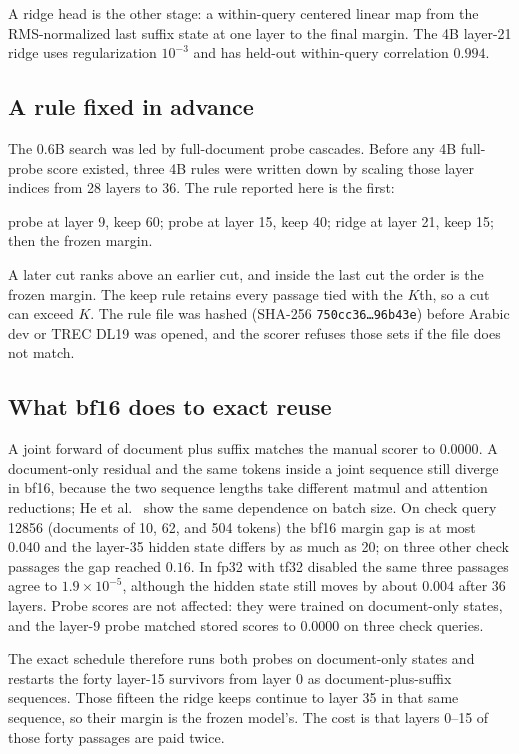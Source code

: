 \documentclass[11pt, a4paper]{article}
\begin{document}
A ridge head is the other stage: a within-query centered linear map from the RMS-normalized last suffix state at one layer to the final margin.
The 4B layer-21 ridge uses regularization $10^{-3}$ and has held-out within-query correlation $0.994$.

\subsection{A rule fixed in advance}

The 0.6B search was led by full-document probe cascades.
Before any 4B full-probe score existed, three 4B rules were written down by scaling those layer indices from 28 layers to 36.
The rule reported here is the first:

\begin{center}
probe at layer 9, keep 60;\quad
probe at layer 15, keep 40;\quad
ridge at layer 21, keep 15;\quad
then the frozen margin.
\end{center}

A later cut ranks above an earlier cut, and inside the last cut the order is the frozen margin.
The keep rule retains every passage tied with the $K$th, so a cut can exceed $K$.
The rule file was hashed (SHA-256 \texttt{750cc36\ldots96b43e}) before Arabic dev or TREC DL19 was opened, and the scorer refuses those sets if the file does not match.

\subsection{What bf16 does to exact reuse}
\label{sec:bf16}

A joint forward of document plus suffix matches the manual scorer to $0.0000$.
A document-only residual and the same tokens inside a joint sequence still diverge in bf16, because the two sequence lengths take different matmul and attention reductions; He et al.\ \cite{he2025nondeterminism} show the same dependence on batch size.
On check query 12856 (documents of 10, 62, and 504 tokens) the bf16 margin gap is at most $0.040$ and the layer-35 hidden state differs by as much as 20; on three other check passages the gap reached $0.16$.
In fp32 with tf32 disabled the same three passages agree to $1.9\times 10^{-5}$, although the hidden state still moves by about $0.004$ after 36 layers.
Probe scores are not affected: they were trained on document-only states, and the layer-9 probe matched stored scores to $0.0000$ on three check queries.

The exact schedule therefore runs both probes on document-only states and restarts the forty layer-15 survivors from layer 0 as document-plus-suffix sequences.
Those fifteen the ridge keeps continue to layer 35 in that same sequence, so their margin is the frozen model's.
The cost is that layers 0--15 of those forty passages are paid twice.
\end{document}
